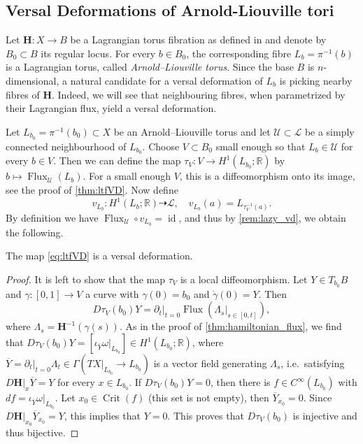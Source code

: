 \documentclass[12pt,a4paper,draft]{scrartcl}
\DeclareMathOperator{\id}{id}
\DeclareMathOperator{\Flux}{Flux}
\DeclareMathOperator{\Crit}{Crit}
\begin{document}
\subsection{Versal Deformations of Arnold-Liouville tori}
\label{sec:vd_AL}

Let $\symbf{H} \colon X \rightarrow B$ be a Lagrangian torus fibration as defined in \cite{evans2021atfs} and denote by $B_0 \subset B$ its regular locus. For every $b \in B_0$, the corresponding fibre $L_b = \pi^{-1}(b)$ is a Lagrangian torus, called \emph{Arnold--Liouville torus}. Since the base $B$ is $n$-dimensional, a natural candidate for a versal deformation of $L_b$ is picking nearby fibres of $\symbf{H}$. Indeed, we will see that neighbouring fibres, when parametrized by their Lagrangian flux, yield a versal deformation. 

Let $L_{b_0} = \pi^{-1}(b_0) \subset X$ be an Arnold--Liouville torus and let $\mathcal{U} \subset \mathcal{L}$ be a simply connected neighbourhood of $L_{b_0}$. Choose $V \subset B_0$ small enough so that $L_b \in \mathcal{U}$ for every $b \in V$. Then we can define the map $τ_V \colon V \rightarrow H^1(L_{b_0};\mathbb{R})$ by $b \mapsto \Flux_{\mathcal{U}}(L_b)$. For a small enough $V$, this is a diffeomorphism onto its image, see the proof of \cref{thm:ltfVD}. Now define
\begin{equation}
    \label{eq:ltfVD}
    v_{L_b} \colon H^1(L_b;\mathbb{R}) \dashrightarrow \mathcal{L}, \quad
    v_{L_b}(a) = L_{τ_V^{-1}(a)}.
\end{equation}
By definition we have $\Flux_{\mathcal{U}} \circ v_{L_b} = \id$, and thus by \cref{rem:lazy_vd}, we obtain the following. 

\begin{proposition}
    \label{thm:ltfVD}
    The map \eqref{eq:ltfVD} is a versal deformation. 
\end{proposition}

\begin{proof}
    It is left to show that the map $τ_V$ is a local diffeomorphism.
    Let $Y \in T_{b_0}B$ and $\gamma \colon [0,1] \rightarrow V$ a curve with $\gamma(0) = b_0$ and $\dot{\gamma}(0) = Y$.
    Then 
    \[
        \label{eq:Dphi}
        Dτ_V(b_0) Y = \partial_t\vert_{t = 0} \Flux (\Lambda_s\vert_{s \in [0,t]}),
    \]
    where $\Lambda_s = \mathbf{H}^{-1}(\gamma(s))$.
    As in the proof of \cref{thm:hamiltonian_flux}, we find that $Dτ_V(b_0) Y = [\iota_{\overline{Y}}\omega \vert_{L_{b_0}}] \in H^1(L_{b_0};\mathbb{R})$, where $\overline{Y} = \partial_t \vert_{t=0} \Lambda_t \in \Gamma(TX\vert_{L_{b_0}} \rightarrow L_{b_0})$ is a vector field generating $\Lambda_s$, i.e.\ satisfying $D\mathbf{H}\vert_x \overline{Y} = Y$ for every $x \in L_{b_0}$.
    If $Dτ_V(b_0) Y = 0$, then there is $f \in C^{\infty}(L_{b_0})$ with $df = \iota_{\overline{Y}}\omega \vert_{L_{b_0}}$.
    Let $x_0 \in \Crit(f)$ (this set is not empty), then $\overline{Y}_{x_0} = 0$.
    Since $D\mathbf{H} \vert_{x_0} \overline{Y}_{x_0} = Y$, this implies that $Y = 0$.
    This proves that $Dτ_V(b_0)$ is injective and thus bijective. 
\end{proof}
\end{document}
